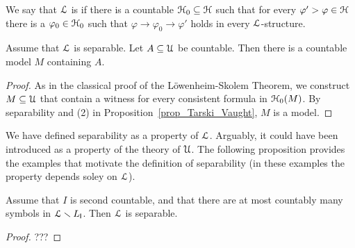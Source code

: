 \documentclass[10pt,oneside]{amsproc}
\renewcommand*{\emph}[1]{%
   \smash{\tikz[baseline]\node[rectangle, fill=teal!25, rounded corners, inner xsep=0.5ex, inner ysep=0.2ex, anchor=base, minimum height = 2.7ex]{\strut #1};}}
\begin{document}
We say that ${\EuScript L}$ is \emph{separable\/} if there is a countable  ${\EuScript H}_0\subseteq{\EuScript H}$ such that for every $\varphi'>\varphi\in{\EuScript H}$ there is a $\varphi_0\in{\EuScript H}_0$ such that $\varphi\rightarrow\varphi_0\rightarrow\varphi'$ holds in every ${\EuScript L}$-structure.

\begin{proposition}
  Assume that ${\EuScript L}$ is separable.
  Let $A\subseteq{\EuScript U}$ be countable.
  Then there is a countable model $M$ containing $A$. 
\end{proposition}

\begin{proof}
  As in the classical proof of the L\"owenheim-Skolem Theorem,
  we construct $M\subseteq{\EuScript U}$ that contain a witness for every consistent formula in ${\EuScript H}_0(M)$.
  By separability and (2) in Proposition~\ref{prop_Tarski_Vaught}, $M$ is a model.
\end{proof}

We have defined separability as a property of ${\EuScript L}$.
Arguably, it could have been introduced as a property of the theory of ${\EuScript U}$.
The following proposition provides the examples that motivate the definition of separability (in these examples the property depends soley on ${\EuScript L}$).

\begin{proposition}
  Assume that $I$ is second countable, and that there are at most countably many symbols in ${\EuScript L}\smallsetminus L_{\sf I}$.
  Then ${\EuScript L}$ is separable.
\end{proposition}
\begin{proof}
  ???
\end{proof}



\end{document}
